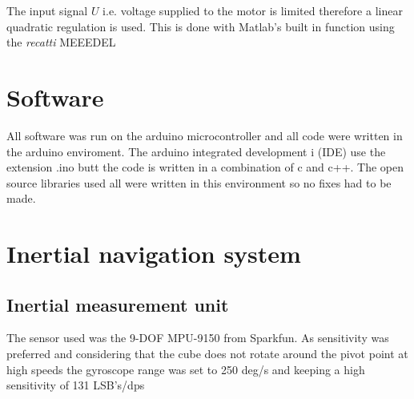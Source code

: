 \documentclass[a4paper,11pt]{kth-mag}
\begin{document}
The input signal $U$ i.e. voltage supplied to the motor is limited therefore a linear quadratic regulation is used. This is done with Matlab's \cite{MATLAB:2014} built in function using the \textit{recatti } MEEEDEL


%
%
%

\section{Software}
All software was run on the arduino microcontroller and all code were written in the arduino enviroment. The arduino integrated development i (IDE) use the extension .ino butt the code is written in a combination of c and c++. The open source libraries used all were written in this environment so no fixes had to be made. 

\section{Inertial navigation system}

\subsection{Inertial measurement unit}
The sensor used was the 9-DOF MPU-9150 from Sparkfun. As sensitivity was preferred and considering that the cube does not rotate around the pivot point at high speeds the gyroscope range was set to 250 deg/s and keeping a high sensitivity of 131 LSB's/dps
\end{document}
